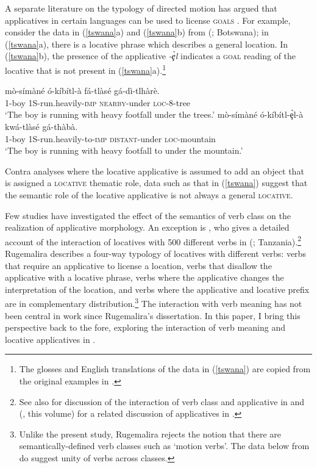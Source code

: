 \documentclass[output=paper]{langsci/langscibook}
\begin{document}
A separate literature on the typology of directed motion has argued that applicatives in certain  languages can be used to license {\scshape goals} \citep{schaefer:1985,sitoe:1996}. For example, consider the data in (\ref{tswana}a) and (\ref{tswana}b) from  (; Botswana); in (\ref{tswana}a), there is a locative phrase which describes a general location. In (\ref{tswana}b), the presence of the applicative \emph{-\c{è}l} indicates a {\scshape goal}  reading of the locative that is not present in (\ref{tswana}a).\footnote{The glosses and English translations of the data in (\ref{tswana}) are copied from the original examples in \citet{schaefer:1985}.}
\begin{exe}
	\ex\label{tswana}\begin{xlist}
		\ex  \gll mò-símàné ó-kíbítl-à fá-tlàsé gá-dì-tlhàrè.\\
			1-boy 1S-run.heavily-{\scshape imp} {\scshape nearby-}under {\scshape loc-8-}tree\\
			\glt `The boy is running with heavy footfall under the trees.'
		\ex\gll mò-símàné ó-kíbítl-\c{è}l-à kwá-tlàsé gá-thàbà.\\
			1-boy 1S-run.heavily-to-{\scshape imp} {\scshape distant}-under {\scshape loc-}mountain\\
			\glt `The boy is running with heavy footfall to under the mountain.'  \citep[Tables VI-VII]{schaefer:1985}
	\end{xlist}
\end{exe}
%
Contra analyses where the locative applicative is assumed to add an object that is assigned a {\scshape locative} thematic role, data such as that in (\ref{tswana}) suggest that the semantic role of the locative applicative is not always a general {\scshape locative}.

Few studies have investigated the effect of the semantics of verb class on the realization of applicative morphology. An exception is \citet{rugemalira:1993}, who gives a detailed account of the interaction of locatives with 500 different verbs in  (; Tanzania).\footnote{See also \citet{CannMabugu2007} for discussion of the interaction of verb class and applicative in  and \citeauthor{sibanda:2016} (\citeyear*{sibanda:2016}, this volume) for a related discussion of applicatives in .} Rugemalira describes a four-way typology of locatives with different verbs: verbs that require an applicative to license a location, verbs that disallow the applicative with a locative phrase, verbs where the applicative changes the interpretation of the location, and verbs where the applicative and locative prefix are in complementary distribution.\footnote{Unlike the present study, Rugemalira rejects the notion that there are semantically-defined verb classes such as `motion verbs'. The data below from  do suggest unity of verbs across classes.}
The interaction with verb meaning has not been central in work since Rugemalira's dissertation. In this paper, I bring this perspective back to the fore, exploring the interaction of verb meaning and locative applicatives in .
\end{document}
